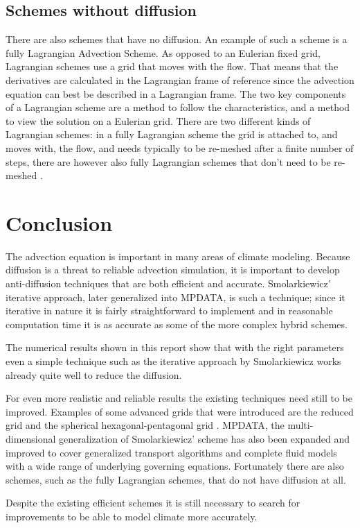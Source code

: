 \documentclass[10pt, a4paper]{article}
\begin{document}
\subsection{Schemes without diffusion}
There are also schemes that have no diffusion. An example of such a scheme is a fully Lagrangian Advection Scheme. As opposed to an Eulerian fixed grid, Lagrangian schemes use a grid that moves with the flow. That means that the derivatives are calculated in the Lagrangian frame of reference since the advection equation can best be described in a Lagrangian frame. The two key components of a Lagrangian scheme are a method to follow the characteristics, and a method to view the solution on a Eulerian grid. There are two different kinds of Lagrangian schemes: in a fully Lagrangian scheme the grid is attached to, and moves with, the flow, and needs typically to be re-meshed after a finite number of steps, there are however also fully Lagrangian schemes that don't need to be re-meshed \cite{nodif}.

\section{Conclusion}
The advection equation is important in many areas of climate modeling. Because diffusion is a threat to reliable advection simulation, it is important to develop anti-diffusion techniques that are both efficient and accurate. Smolarkiewicz' iterative approach, later generalized into MPDATA, is such a technique; since it iterative in nature it is fairly straightforward to implement and in reasonable computation time it is as accurate as some of the more complex hybrid schemes.

The numerical results shown in this report show that with the right parameters even a simple technique such as the iterative approach by Smolarkiewicz works already quite well to reduce the diffusion.

For even more realistic and reliable results the existing techniques need still to be improved. Examples of some advanced grids that were introduced are the reduced grid \cite{spee} and the spherical hexagonal-pentagonal grid \cite{lipscomb}. MPDATA, the multi-dimensional generalization of Smolarkiewicz' scheme has also been expanded and improved to cover generalized transport algorithms and complete fluid models with a wide range of underlying governing equations. Fortunately there are also schemes, such as the fully Lagrangian schemes, that do not have diffusion at all.

Despite the existing efficient schemes it is still necessary to search for improvements to be able to model climate more accurately.



\end{document}
